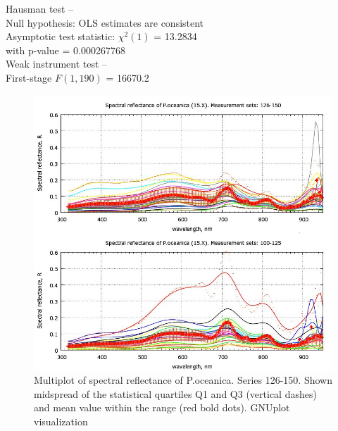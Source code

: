 \documentclass[10pt, a4paper]{article}
\begin{document}
\begin{appendices}
\begin{table}[htbp]
\begin{center}
\vspace{1em}
\begin{raggedright}
Hausman test --\\
\quad Null hypothesis: OLS estimates are consistent\\
\quad Asymptotic test statistic: $\chi^2(1)$ = 13.2834\\
\quad with p-value = 0.000267768\\
\vspace{1ex}
Weak instrument test -- \\
\quad First-stage $F(1, 190)$ = 16670.2 \\
\end{raggedright}

\end{center}
\label{tab:14}
\end{table}

\begin{figure}[H]
\begin{center}
\includegraphics[scale=0.4]{GNU-14.jpg}
\caption{Multiplot of spectral reflectance of P.oceanica. Series 126-150. Shown midspread of the statistical quartiles Q1 and Q3 (vertical dashes) and
mean value within the range (red bold dots). GNUplot visualization­}
\label{fig:56}
\end{center}
\end{figure}


\end{appendices}
\end{document}
